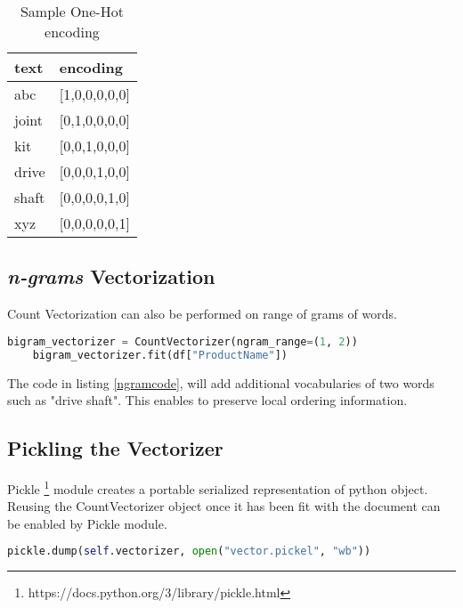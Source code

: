 \begin{table}[]
    \centering
    \caption{Sample One-Hot encoding}
    \label{table:countencode}
    \begin{tabular}{ ll }
          \toprule
          
          \textbf{text}& \textbf{encoding}\\
          \midrule
          abc&[1,0,0,0,0,0]\\
          joint&[0,1,0,0,0,0]\\
          kit&[0,0,1,0,0,0]\\
          drive&[0,0,0,1,0,0]\\
          shaft&[0,0,0,0,1,0]\\
          xyz&[0,0,0,0,0,1]\\
       
          \bottomrule
          \end{tabular}
\end{table}

\subsection{ \textit{n-grams} Vectorization} \label{sec:ngram_vector}

Count Vectorization can also be performed on range of grams of words. 

\begin{lstlisting}[language=Python,label=ngramcode, caption={\textit{n-gram} vectorization}]
    bigram_vectorizer = CountVectorizer(ngram_range=(1, 2))
    bigram_vectorizer.fit(df["ProductName"])
\end{lstlisting}


The code in listing \ref{ngramcode}, will add additional vocabularies of two words such as "drive shaft". This enables to preserve local ordering information. 

\subsection{Pickling the Vectorizer} \label{pickle_vector}

Pickle \footnote{https://docs.python.org/3/library/pickle.html} module creates a portable serialized representation of python object. Reusing the CountVectorizer object once it has been fit with the document can be enabled by Pickle module. 

\begin{lstlisting}[language=Python,label=pickle, caption={Pickle vectorization}]
    pickle.dump(self.vectorizer, open("vector.pickel", "wb"))
\end{lstlisting}

